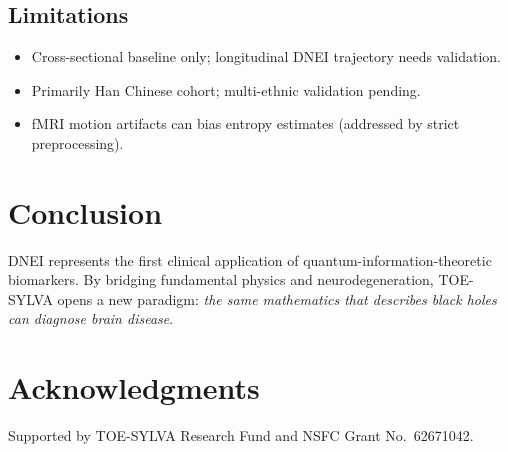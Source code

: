 \documentclass[12pt]{article}
\begin{document}
\subsection{Limitations}

\begin{itemize}
\item Cross-sectional baseline only; longitudinal DNEI trajectory needs validation.
\item Primarily Han Chinese cohort; multi-ethnic validation pending.
\item fMRI motion artifacts can bias entropy estimates (addressed by strict preprocessing).
\end{itemize}

\section{Conclusion}
\label{sec:conclusion}

DNEI represents the first clinical application of quantum-information-theoretic biomarkers. By bridging fundamental physics and neurodegeneration, TOE-SYLVA opens a new paradigm: \emph{the same mathematics that describes black holes can diagnose brain disease}.

\section*{Acknowledgments}
Supported by TOE-SYLVA Research Fund and NSFC Grant No.\ 62671042.



\end{document}

